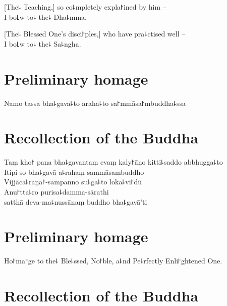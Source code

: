 [The꜕ Teaching,] so co꜕mpletely expla꜓ined by him --\\
I bo꜖w to꜕ the꜕ Dha꜕mma. 

[The꜕ Blessed One's disci꜓ples,] who have pra꜕ctised well --\\
I bo꜖w to꜕ the꜕ Sa꜕ngha. 

\clearpage

\chapter{Preliminary homage}%

\begin{leader}
\end{leader}

Namo tassa bha꜕gava꜕to araha꜕to sa꜓mmāsa꜓mbuddha꜕ssa


\chapter{Recollection of the Buddha}%

\begin{leader}
\end{leader}

Taṃ kho꜓ pana bha꜕gavantaṃ evaṃ kaly꜓āṇo kitti꜕saddo abbhugga꜕to\\
Itipi so bha꜕gavā a꜕rahaṃ sammāsambuddho\\
Vijjāca꜕raṇa꜓-sampanno su꜕ga꜕to loka꜕vi꜓dū\\
Anu꜓tta꜕ro purisa꜕damma-sārathi\\
\vin satthā deva-ma꜕nussānaṃ buddho bha꜕gavā'ti

\clearpage

\chapter{Preliminary homage}%

\begin{leader}
\end{leader}

Ho꜓ma꜓ge to the꜕ Ble꜕ssed, No꜓ble, a꜕nd Pe꜕rfectly Enli꜓ghtened One.


\chapter{Recollection of the Buddha}%

